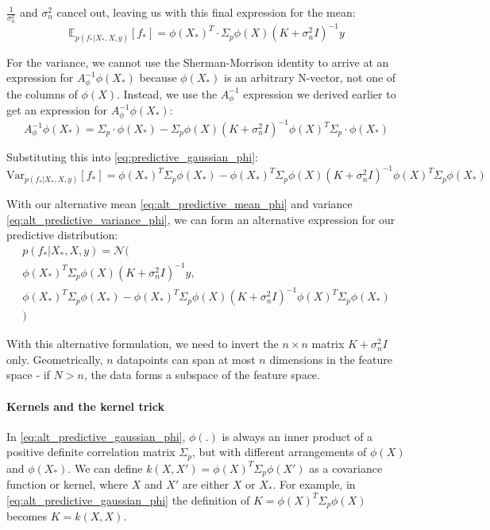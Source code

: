 $\frac{1}{\sigma_n^2}$ and $\sigma_n^2$ cancel out, leaving us with this final expression for the mean:
\begin{equation} \label{eq:alt_predictive_mean_phi}
    \mathbb{E}_{p(f_*|X_*,X,y)}[f_*] = \phi(X_*)^T \cdot \Sigma_p\phi(X)(K+\sigma_n^2I)^{-1}y
\end{equation}

For the variance, we cannot use the Sherman-Morrison identity to arrive at an expression for $A_{\phi}^{-1}\phi(X_*)$ because $\phi(X_*)$ is an arbitrary N-vector, not one of the columns of $\phi(X)$. Instead, we use the $A_{\phi}^{-1}$ expression we derived earlier to get an expression for $A_{\phi}^{-1}\phi(X_*)$:
\begin{equation*}
    A_{\phi}^{-1}\phi(X_*) = \Sigma_p \cdot \phi(X_*) - \Sigma_p\phi(X)(K+\sigma_n^2I)^{-1}\phi(X)^T\Sigma_p \cdot \phi(X_*)
\end{equation*}

 Substituting this into \ref{eq:predictive_gaussian_phi}:
\begin{equation} \label{eq:alt_predictive_variance_phi}
    \text{Var}_{p(f_*|X_*,X,y)}[f_*] = \phi(X_*)^T\Sigma_p\phi(X_*) - \phi(X_*)^T\Sigma_p\phi(X)(K+\sigma_n^2I)^{-1}\phi(X)^T\Sigma_p\phi(X_*)
\end{equation}

With our alternative mean \ref{eq:alt_predictive_mean_phi} and variance \ref{eq:alt_predictive_variance_phi}, we can form an alternative expression for our predictive distribution:
\begin{equation} \label{eq:alt_predictive_gaussian_phi}
    \begin{aligned}
        p(f_*|X_*,X,y) = \mathcal{N}( \\
        \phi(X_*)^T\Sigma_p\phi(X)(K+\sigma_n^2I)^{-1}y , \\
        \phi(X_*)^T\Sigma_p\phi(X_*) - \phi(X_*)^T\Sigma_p\phi(X)(K+\sigma_n^2I)^{-1}\phi(X)^T\Sigma_p\phi(X_*) \\
        )
    \end{aligned}
\end{equation}

With this alternative formulation, we need to invert the $n \times n$ matrix $K + \sigma_n^2I$ only. Geometrically, $n$ datapoints can span at most $n$ dimensions in the feature space - if $N > n$, the data forms a subspace of the feature space.

\paragraph{Kernels and the kernel trick}
In \ref{eq:alt_predictive_gaussian_phi}, $\phi(.)$ is always an inner product of a positive definite correlation matrix $\Sigma_p$, but with different arrangements of $\phi(X)$ and $\phi(X_*)$. We can define $k(X,X') = \phi(X)^T\Sigma_p\phi(X')$ as a covariance function or kernel, where $X$ and $X'$ are either $X$ or $X_*$. For example, in \ref{eq:alt_predictive_gaussian_phi} the definition of $K = \phi(X)^T\Sigma_p\phi(X)$ becomes $K = k(X,X)$.

